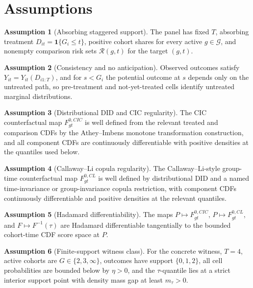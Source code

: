 \documentclass[11pt]{article}
\newcommand{\one}{\mathbf{1}}
\theoremstyle{definition}
\newtheorem{assumption}{Assumption}
\theoremstyle{plain}
\theoremstyle{remark}
\begin{document}
\section{Assumptions}
\begin{assumption}[Absorbing staggered support]\label{ass:staggered-support}
The panel has fixed \(T\), absorbing treatment \(D_{it}=\one\{G_i\le t\}\), positive cohort shares for every active \(g\in\mathcal G\), and nonempty comparison risk sets \(\mathcal R(g,t)\) for the target \((g,t)\).
\end{assumption}

\begin{assumption}[Consistency and no anticipation]\label{ass:consistency-noanticipation}
Observed outcomes satisfy \(Y_{it}=Y_{it}(D_{i1:T})\), and for \(s<G_i\) the potential outcome at \(s\) depends only on the untreated path, so pre-treatment and not-yet-treated cells identify untreated marginal distributions.
\end{assumption}

\begin{assumption}[Distributional DID and CIC regularity]\label{ass:cic-regular}
The CIC counterfactual map \(F^{0,CIC}_{gt}\) is well defined from the relevant treated and comparison CDFs by the Athey--Imbens monotone transformation construction, and all component CDFs are continuously differentiable with positive densities at the quantiles used below.
\end{assumption}

\begin{assumption}[Callaway--Li copula regularity]\label{ass:cl-regular}
The Callaway--Li-style group-time counterfactual map \(F^{0,CL}_{gt}\) is well defined by distributional DID and a named time-invariance or group-invariance copula restriction, with component CDFs continuously differentiable and positive densities at the relevant quantiles.
\end{assumption}

\begin{assumption}[Hadamard differentiability]\label{ass:hadamard}
The maps \(P\mapsto F^{0,CIC}_{gt}\), \(P\mapsto F^{0,CL}_{gt}\), and \(F\mapsto F^{-1}(\tau)\) are Hadamard differentiable tangentially to the bounded cohort-time CDF score space at \(P\).
\end{assumption}

\begin{assumption}[Finite-support witness class]\label{ass:finite-witness}
For the concrete witness, \(T=4\), active cohorts are \(G\in\{2,3,\infty\}\), outcomes have support \(\{0,1,2\}\), all cell probabilities are bounded below by \(\eta>0\), and the \(\tau\)-quantile lies at a strict interior support point with density mass gap at least \(m_\tau>0\).
\end{assumption}
\end{document}
